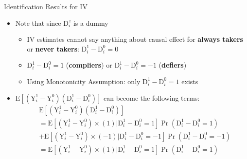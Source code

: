 \documentclass[dvipsnames,hyperref={pdfpagelabels=false}]{beamer}
\begin{document}
\begin{frame}{Identification Results for IV}
	\begin{itemize}
		
		\item Note that since $\mathrm{D}^{z}_{i}$ is a dummy 
		\vspace{0.2cm}
		\begin{itemize}
			\item IV estimates cannot say anything about causal effect for \textbf{always takers} or \textbf{never takers}: $\mathrm{D}^{1}_{i}-\mathrm{D}^{0}_{i}=0$
			\vspace{0.2cm}
			\item $\mathrm{D}^{1}_{i}-\mathrm{D}^{0}_{i}=1$ (\textbf{compliers}) or $\mathrm{D}^{1}_{i}-\mathrm{D}^{0}_{i}=-1$ (\textbf{defiers})	
			\vspace{0.2cm}
			\item Using Monotonicity Assumption: only $\mathrm{D}^{1}_{i}-\mathrm{D}^{0}_{i}=1$ exists	
			\vspace{0.2cm}	
		\end{itemize}	
		\item $\mathrm{E}[(\mathrm{Y}^{1}_{i}-\mathrm{Y}^{0}_{i})(\mathrm{D}^{1}_{i}-\mathrm{D}^{0}_{i})]$ can become the following terms:
		\begin{equation*}
			\begin{aligned}
				& \mathrm{E}[(\mathrm{Y}^{1}_{i}-\mathrm{Y}^{0}_{i})(\mathrm{D}^{1}_{i}-\mathrm{D}^{0}_{i})]  \\
				& = \mathrm{E}[(\mathrm{Y}^{1}_{i}-\mathrm{Y}^{0}_{i}) \times (1)|\mathrm{D}^{1}_{i}-\mathrm{D}^{0}_{i}=1] \Pr(\mathrm{D}^{1}_{i}-\mathrm{D}^{0}_{i}=1) \\
				&+ \mathrm{E}[(\mathrm{Y}^{1}_{i}-\mathrm{Y}^{0}_{i}) \times (-1)|\mathrm{D}^{1}_{i}-\mathrm{D}^{0}_{i}=-1] \Pr(\mathrm{D}^{1}_{i}-\mathrm{D}^{0}_{i}=-1) \\
				& = \mathrm{E}[(\mathrm{Y}^{1}_{i}-\mathrm{Y}^{0}_{i}) \times (1)|\mathrm{D}^{1}_{i}-\mathrm{D}^{0}_{i}=1] \Pr(\mathrm{D}^{1}_{i}-\mathrm{D}^{0}_{i}=1)
			\end{aligned}
		\end{equation*}
		
		
	\end{itemize}	
\end{frame}
\end{document}

